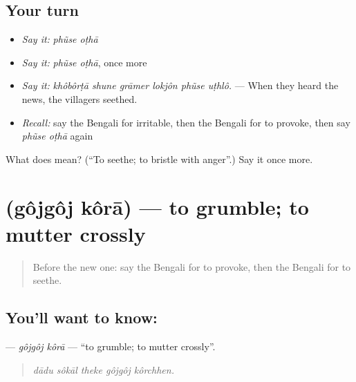\subsection*{Your turn}
\begin{itemize}
\raggedright
  \item \emph{Say it:} \emph{phũse oṭhā}
  \item \emph{Say it:} \emph{phũse oṭhā}, once more
  \item \emph{Say it:} \emph{khôbôrṭā shune grāmer lokjôn phũse uṭhlô.} — When they heard the news, the villagers seethed.
  \item \emph{Recall:} say the Bengali for irritable, then the Bengali for to provoke, then say \emph{phũse oṭhā} again
\end{itemize}

\begin{tcolorbox}[breakable,colback=teal!4,colframe=teal!35!black,title={Before you move on}]
What does   mean? (\textquotedblleft{}To seethe; to bristle with anger\textquotedblright{}.) Say it once more.
\end{tcolorbox}
\section[\texorpdfstring{\bn{গজগজ} \bn{করা} (gôjgôj kôrā)}{গজগজ করা (gôjgôj kôrā)}]{  (gôjgôj kôrā) — to grumble; to mutter crossly}

\label{lesson:BN-C443-gojgoj-kora}



\begin{quote}
Before the new one: say the Bengali for to provoke, then the Bengali for to seethe.
\end{quote}

\subsection*{You'll want to know:  }
\textbf{ } — \emph{gôjgôj kôrā} — \textquotedblleft{}to grumble; to mutter crossly\textquotedblright{}.

\begin{quote}
    
\end{quote}

\begin{quote}
\emph{dādu sôkāl theke gôjgôj kôrchhen.}
\end{quote}

